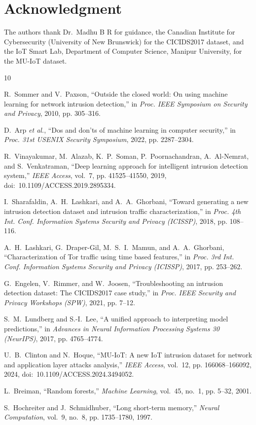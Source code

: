 \documentclass[conference]{IEEEtran}
\begin{document}
\section*{Acknowledgment}

The authors thank Dr.~Madhu B R for guidance, the Canadian Institute for
Cybersecurity (University of New Brunswick) for the CICIDS2017 dataset, and
the IoT Smart Lab, Department of Computer Science, Manipur University, for
the MU-IoT dataset.

\balance
\begin{thebibliography}{10}

 R.~Sommer and V.~Paxson, ``Outside the closed world: On using
machine learning for network intrusion detection,'' in \emph{Proc. IEEE
Symposium on Security and Privacy}, 2010, pp. 305--316.

 D.~Arp \emph{et al.}, ``Dos and don'ts of machine learning in
computer security,'' in \emph{Proc. 31st USENIX Security Symposium}, 2022,
pp. 2287--2304.

 R.~Vinayakumar, M.~Alazab, K.~P.~Soman, P.~Poornachandran,
A.~Al-Nemrat, and S.~Venkatraman, ``Deep learning approach for intelligent
intrusion detection system,'' \emph{IEEE Access}, vol.~7, pp. 41525--41550,
2019, doi:~10.1109/ACCESS.2019.2895334.

 I.~Sharafaldin, A.~H.~Lashkari, and A.~A.~Ghorbani, ``Toward
generating a new intrusion detection dataset and intrusion traffic
characterization,'' in \emph{Proc. 4th Int. Conf. Information Systems Security
and Privacy (ICISSP)}, 2018, pp. 108--116.

 A.~H.~Lashkari, G.~Draper-Gil, M.~S.~I.~Mamun, and
A.~A.~Ghorbani, ``Characterization of Tor traffic using time based
features,'' in \emph{Proc. 3rd Int. Conf. Information Systems Security and
Privacy (ICISSP)}, 2017, pp. 253--262.

 G.~Engelen, V.~Rimmer, and W.~Joosen, ``Troubleshooting an
intrusion detection dataset: The CICIDS2017 case study,'' in \emph{Proc. IEEE
Security and Privacy Workshops (SPW)}, 2021, pp. 7--12.

 S.~M.~Lundberg and S.-I.~Lee, ``A unified approach to
interpreting model predictions,'' in \emph{Advances in Neural Information
Processing Systems 30 (NeurIPS)}, 2017, pp. 4765--4774.

 U.~B.~Clinton and N.~Hoque, ``MU-IoT: A new IoT intrusion
dataset for network and application layer attacks analysis,'' \emph{IEEE
Access}, vol.~12, pp. 166068--166092, 2024,
doi:~10.1109/ACCESS.2024.3494052.

 L.~Breiman, ``Random forests,'' \emph{Machine Learning},
vol.~45, no.~1, pp. 5--32, 2001.

 S.~Hochreiter and J.~Schmidhuber, ``Long short-term memory,''
\emph{Neural Computation}, vol.~9, no.~8, pp. 1735--1780, 1997.

\end{thebibliography}
\end{document}
